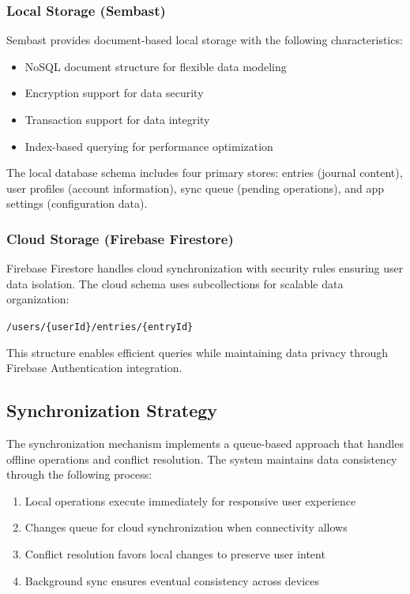 \documentclass[conference]{IEEEtran}
\begin{document}
\subsubsection{Local Storage (Sembast)}

Sembast provides document-based local storage with the following characteristics:
\begin{itemize}
\item NoSQL document structure for flexible data modeling
\item Encryption support for data security
\item Transaction support for data integrity
\item Index-based querying for performance optimization
\end{itemize}

The local database schema includes four primary stores: entries (journal content), user profiles (account information), sync queue (pending operations), and app settings (configuration data).

\subsubsection{Cloud Storage (Firebase Firestore)}

Firebase Firestore handles cloud synchronization with security rules ensuring user data isolation. The cloud schema uses subcollections for scalable data organization:

\texttt{/users/\{userId\}/entries/\{entryId\}}

This structure enables efficient queries while maintaining data privacy through Firebase Authentication integration.

\subsection{Synchronization Strategy}

The synchronization mechanism implements a queue-based approach that handles offline operations and conflict resolution. The system maintains data consistency through the following process:

\begin{enumerate}
\item Local operations execute immediately for responsive user experience
\item Changes queue for cloud synchronization when connectivity allows
\item Conflict resolution favors local changes to preserve user intent
\item Background sync ensures eventual consistency across devices
\end{enumerate}
\end{document}
